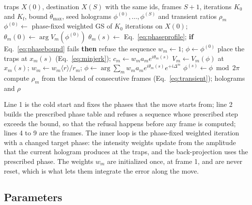 \begin{algorithm}[t]
\caption{Flicker-bounded sequence for a move from traps $X(0)$ to $X(S)$ with end phases $\theta^{\mathrm{end}}$ (held by default).}
\label{alg:flicker}
\begin{algorithmic}[1]
\Require traps $X(0)$, destination $X(S)$ with the same ids, frames $S+1$, iterations $K_0$ and $K_{\mathrm f}$, bound $\dot\theta_{\max}$, seed
\Ensure holograms $\phi^{(0)},\dots,\phi^{(S)}$ and transient ratios $\rho_m$
\State $\phi^{(0)}\gets$ phase-fixed weighted GS of $K_0$ iterations on $X(0)$; $\theta_m(0)\gets\arg V_m(\phi^{(0)})$
\State $\theta_m(s)\gets$ Eq.~\ref{eq:phaseprofile}; \textbf{if} Eq.~\ref{eq:phasebound} fails \textbf{then} refuse the sequence
\State $w_m\gets1$; $\phi\gets\phi^{(0)}$
  \State place the traps at $x_m(s)$ (Eq.~\ref{eq:minjerk}); $c_m\gets w_ma_me^{i\theta_m(s)}$
    \State $V_m\gets V_m(\phi)$ at $x_m(s)$; $w_m\gets w_m\langle r\rangle/r_m$; $\phi\gets\arg\sum_mw_ma_me^{i\theta_m(s)}e^{+i\Delta^m}$ 
  \EndFor
  \State $\phi^{(s)}\gets\phi\bmod2\pi$
\EndFor
\State compute $\rho_m$ from the blend of consecutive frames (Eq.~\ref{eq:transient}); \Return holograms and $\rho$
\end{algorithmic}
\end{algorithm}

Line 1 is the cold start and fixes the phases that the move starts from; line 2 builds the prescribed phase table and refuses a sequence whose prescribed step exceeds the bound, so that the refusal happens before any frame is computed; lines 4 to 9 are the frames. The inner loop is the phase-fixed weighted iteration with a changed target phase: the intensity weights update from the amplitude that the current hologram produces at the traps, and the back-projection uses the prescribed phase. The weights $w_m$ are initialized once, at frame 1, and are never reset, which is what lets them integrate the error along the move.

\subsection{Parameters}

